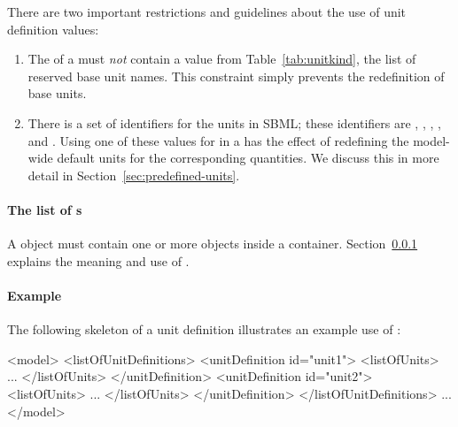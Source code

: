 There are two important restrictions and guidelines about the use
of unit definition  values:
\begin{enumerate}
  
\item The  of a \UnitDefinition must \emph{not} contain
  a value from Table~\ref{tab:unitkind}, the list of
    reserved base unit names.  This constraint simply prevents
  the redefinition of base units.

\item There is a set of  identifiers for the
   units in SBML; these identifiers are ,
  , , , and .  Using
  one of these values for  in a \UnitDefinition has the
  effect of redefining the model-wide default units for the
  corresponding quantities.  We discuss this in more detail in
  Section~\ref{sec:predefined-units}.

\end{enumerate}


\paragraph{The list of s}
\label{sec:listofunits}

A \UnitDefinition object must contain one or more \Unit objects
inside a \ListOfUnits container.
Section~\ref{sec:unit-structure} explains the meaning and use of
\Unit.


\paragraph{Example}

The following skeleton of a unit definition illustrates an example
use of \UnitDefinition:

\begin{example}

<model>
    <listOfUnitDefinitions>
        <unitDefinition id="unit1">
            <listOfUnits>
                ...
            </listOfUnits>
        </unitDefinition>
        <unitDefinition id="unit2">
            <listOfUnits>
                ...
            </listOfUnits>
        </unitDefinition>
    </listOfUnitDefinitions>
    ...
</model>
\end{example}


\subsubsection{}
\label{sec:unit-structure}

